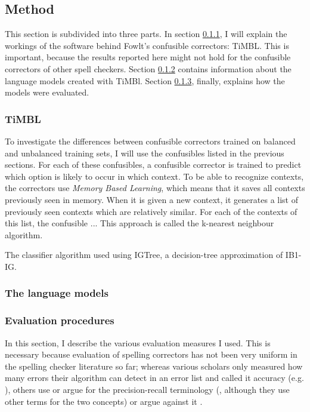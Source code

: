 \documentclass[12pt]{article}
\begin{document}

\subsection{Method}
This section is subdivided into three parts. In section \ref{timbl}, I will explain the workings of the software behind Fowlt's confusible correctors: TiMBL. This is important, because the results reported here might not hold for the confusible correctors of other spell checkers. Section \ref{langmod} contains information about the language models created with TiMBl. Section \ref{eval}, finally, explains how the models were evaluated.


\subsubsection{TiMBL} \label{timbl}
To investigate the differences between confusible correctors trained on balanced and unbalanced training sets, I will use the confusibles listed in the previous sections. For each of these confusibles, a confusible corrector is trained to predict which option is likely to occur in which context. To be able to recognize contexts, the correctors use \emph{Memory Based Learning}, which means that it saves all contexts previously seen in memory. When it is given a new context, it generates a list of previously seen contexts which are relatively similar. For each of the contexts of this list, the confusible ... This approach is called the k-nearest neighbour algorithm.

The classifier algorithm used using IGTree, a decision-tree approximation of IB1-IG.

\subsubsection{The language models} \label{langmod}

\subsubsection{Evaluation procedures} \label{eval}

In this section, I describe the various evaluation measures I used. This is necessary because evaluation of spelling correctors has not been very uniform in the spelling checker literature so far; whereas various scholars only measured how many errors their algorithm can detect in an error list and called it accuracy (e.g. \citealp{agirre98, bm00, tm02,vandelden04}), others use or argue for the precision-recall terminology (\citealp{reynaert08,pz84}, although they use other terms for the two concepts) or argue against it \citep{sp02}.\\\indent
\end{document}
